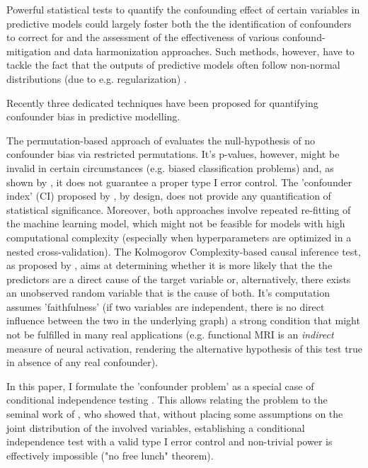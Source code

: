 \documentclass{article}
\begin{document}
Powerful statistical tests to quantify the confounding effect of certain variables in predictive models could largely foster both the the identification of confounders to correct for and the assessment of the effectiveness of various confound-mitigation and data harmonization approaches. Such methods, however, have to tackle the fact that the outputs of predictive models often follow non-normal distributions (due to e.g. regularization) \citep{garcia2009study, kristensen2017whole}.

Recently three dedicated techniques \citep{chaibub2019permutation, ferrari2020measuring, wachinger2021detect} have been proposed for quantifying confounder bias in predictive modelling.

The permutation-based approach of \cite{chaibub2019permutation} evaluates the null-hypothesis of no confounder bias via restricted permutations. It's p-values, however, might be invalid in certain circumstances (e.g. biased classification problems) and, as shown by \cite{ferrari2020measuring}, it does not guarantee a proper type I error control.
The 'confounder index' (CI) proposed by \cite{ferrari2020measuring}, by design, does not provide any quantification of statistical significance.
Moreover, both approaches involve repeated re-fitting of the machine learning model, which might not be feasible for models with high computational complexity (especially when hyperparameters are optimized in a nested cross-validation).
The Kolmogorov Complexity-based causal inference test, as proposed by \cite{wachinger2021detect}, aims at determining whether it is more likely that the the predictors are a direct cause of the target variable or, alternatively, there exists an unobserved random variable that is the cause of both. It's computation assumes 'faithfulness' (if two variables are independent, there is no direct influence between the two in the underlying graph) a strong condition that might not be fulfilled in many real applications (e.g. functional MRI is an \emph{indirect} measure of neural activation, rendering the alternative hypothesis of this test true in absence of any real confounder).


In this paper, I formulate the 'confounder problem' as a special case of conditional independence testing \citep{dawid1979conditional}. This allows relating the problem to the seminal work of \cite{shah2020hardness}, who showed that, without placing some assumptions on the joint distribution of the involved variables, establishing a conditional independence test with a valid type I error control and non-trivial power is effectively impossible ("no free lunch" theorem).
\end{document}
